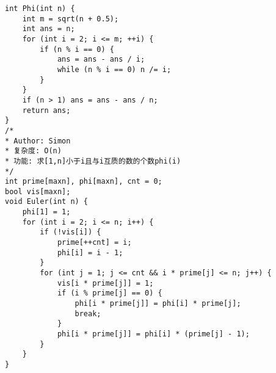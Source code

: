\begin{lstlisting}
int Phi(int n) {
	int m = sqrt(n + 0.5);
	int ans = n;
	for (int i = 2; i <= m; ++i) {
		if (n % i == 0) {
			ans = ans - ans / i;
			while (n % i == 0) n /= i;
		}
	}
	if (n > 1) ans = ans - ans / n;
	return ans;
}
/*
* Author: Simon
* 复杂度: O(n)
* 功能: 求[1,n]小于i且与i互质的数的个数phi(i)
*/
int prime[maxn], phi[maxn], cnt = 0;
bool vis[maxn];
void Euler(int n) {
	phi[1] = 1;
	for (int i = 2; i <= n; i++) {
		if (!vis[i]) {
			prime[++cnt] = i;
			phi[i] = i - 1;
		}
		for (int j = 1; j <= cnt && i * prime[j] <= n; j++) {
			vis[i * prime[j]] = 1;
			if (i % prime[j] == 0) {
				phi[i * prime[j]] = phi[i] * prime[j];
				break;
			}
			phi[i * prime[j]] = phi[i] * (prime[j] - 1);
		}
	}
}
\end{lstlisting}